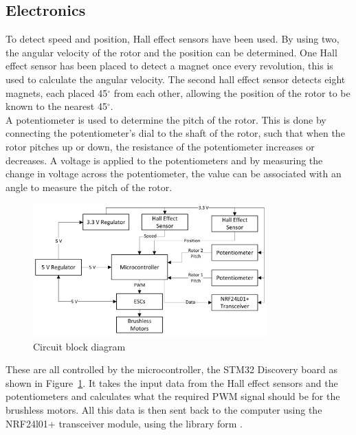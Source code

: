         \subsection{Electronics}
            To detect speed and position, Hall effect sensors have been used. By using two, the angular velocity of the rotor and the position can be determined. One Hall effect sensor has been placed to detect a magnet once every revolution, this is used to calculate the angular velocity. The second hall effect sensor detects eight magnets, each placed 45\(^\circ\) from each other, allowing the position of the rotor to be known to the nearest 45\(^\circ\).\\
            A potentiometer is used to determine the pitch of the rotor. This is done by connecting the potentiometer's dial to the shaft of the rotor, such that when the rotor pitches up or down, the resistance of the potentiometer increases or decreases. A voltage is applied to the potentiometers and by measuring the change in voltage across the potentiometer, the value can be associated with an angle to measure the pitch of the rotor.\\
            \begin{figure} [h]               
                \centering
                \includegraphics*[width =0.8\textwidth]{figs/Design/Final Design/Electronic Systems.png}
                \caption{Circuit block diagram}
                \label{fig: circuit_block_diagram}
            \end{figure}
            These are all controlled by the microcontroller, the STM32 Discovery board as shown in Figure~\ref{fig: circuit_block_diagram}. It takes the input data from the Hall effect sensors and the potentiometers and calculates what the required PWM signal should be for the brushless motors. All this data is then sent back to the computer using the NRF24l01+ transceiver module, using the library form \cite{nrf24l01Program}.
            

